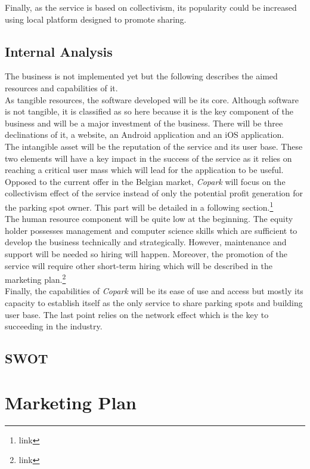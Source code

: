 \documentclass[12pt,a4paper,oneside]{book}
\newcommand{\bp}{\textit{Copark }}
\begin{document}
Finally, as the service is based on collectivism, its popularity could be increased using local platform designed to promote sharing.

\section{Internal Analysis}
The business is not implemented yet but the following describes the aimed resources and capabilities of it.\\

As tangible resources, the software developed will be its core. Although software is not tangible, it is classified as so here because it is the key component of the business and will be a major investment of the business. There will be three declinations of it, a website, an Android application and an iOS application.\\

The intangible asset will be the reputation of the service and its user base. These two elements will have a key impact in the success of the service as it relies on reaching a critical user mass which will lead for the application to be useful. Opposed to the current offer in the Belgian market, \bp will focus on the collectivism effect of the service instead of only the potential profit generation for the parking spot owner. This part will be detailed in a following section.\footnote{link}\\

The human resource component will be quite low at the beginning. The equity holder possesses management and computer science skills which are sufficient to develop the business technically and strategically. However, maintenance and support will be needed so hiring will happen. Moreover, the promotion of the service will require other short-term hiring which will be described in the marketing plan.\footnote{link}\\

Finally, the capabilities of \bp will be its ease of use and access but mostly its capacity to establish itself as the only service to share parking spots and building user base. The last point relies on the network effect which is the key to succeeding in the industry.

\section{SWOT}

\chapter{Marketing Plan}
\end{document}
